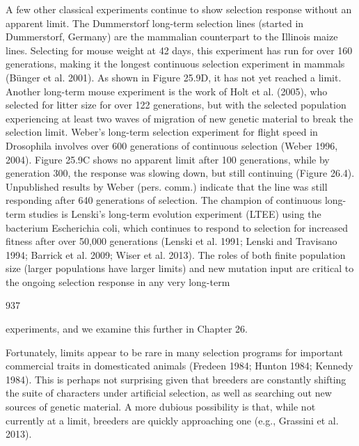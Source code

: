 \documentclass{article}
\begin{document}
A few other classical experiments continue to show selection response without an apparent limit. The Dummerstorf long-term selection lines (started in Dummerstorf, Germany) are the mammalian counterpart to the Illinois maize lines. Selecting for mouse weight at 42 days, this experiment has run for over 160 generations, making it the longest continuous selection experiment in mammals (Bünger et al. 2001). As shown in Figure 25.9D, it has not yet reached a limit. Another long-term mouse experiment is the work of Holt et al. (2005), who selected for litter size for over 122 generations, but with the selected population experiencing at least two waves of migration of new genetic material to break the selection limit. Weber's long-term selection experiment for flight speed in Drosophila involves over 600 generations of continuous selection (Weber 1996, 2004). Figure 25.9C shows no apparent limit after 100 generations, while by generation 300, the response was slowing down, but still continuing (Figure 26.4). Unpublished results by Weber (pers. comm.) indicate that the line was still responding after 640 generations of selection. The champion of continuous long-term studies is Lenski's long-term evolution experiment (LTEE) using the bacterium Escherichia coli, which continues to respond to selection for increased fitness after over 50,000 generations (Lenski et al. 1991; Lenski and Travisano 1994; Barrick et al. 2009; Wiser et al. 2013). The roles of both finite population size (larger populations have larger limits) and new mutation input are critical to the ongoing selection response in any very long-term

937

experiments, and we examine this further in Chapter 26.

Fortunately, limits appear to be rare in many selection programs for important commercial traits in domesticated animals (Fredeen 1984; Hunton 1984; Kennedy 1984). This is perhaps not surprising given that breeders are constantly shifting the suite of characters under artificial selection, as well as searching out new sources of genetic material. A more dubious possibility is that, while not currently at a limit, breeders are quickly approaching one (e.g., Grassini et al. 2013).
\end{document}
